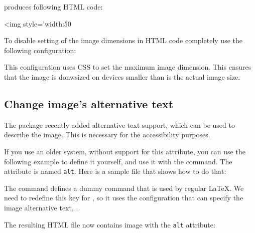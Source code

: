 produces following HTML code:

\begin{htmlsource}
<img style='width:50%
\end{htmlsource}

To disable setting of the image dimensions in HTML code completely
use the following configuration:

\begin{texsource}

\EndPreamble
\end{texsource}

This configuration uses CSS to set the maximum image dimension. This ensures that
the image is donwsized on devices smaller than is the actual image size.


\subsection{Change image's alternative text}

The  package recently added alternative text support,
which can be used to describe the image. This is necessary
for the accessibility purposes.

If you use an older system, without support for this attribute, 
you can use the following example to define it yourself, and use it 
with the  command. The attribute is named 
\texttt{alt}. Here is a sample file that shows how to do that:


The  command defines a dummy command that
is used by regular \LaTeX. We need to redefine this key for \texfourht, so it uses the
configuration that can specify the image alternative text, .


The resulting HTML file now contains image with the \texttt{alt} attribute:

